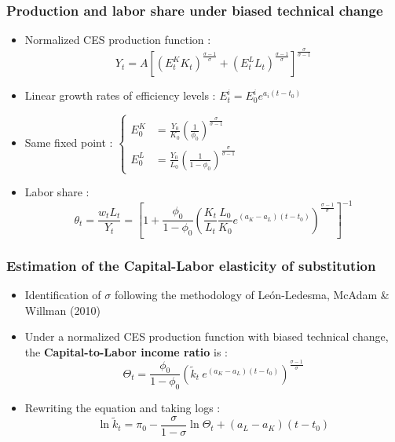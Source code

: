 \documentclass{beamer}
\begin{document}
		\begin{frame}[label = leon]\frametitle{Production and labor share under biased technical change}
			\begin{itemize}
				\item Normalized CES production function :
				\begin{equation*}
					Y_t = A\left[\left(E_t^K K_t\right)^{\frac{\sigma - 1}{\sigma}} + \left(E_t^L L_t\right)^{\frac{\sigma - 1}{\sigma}}\right]^{\frac{\sigma}{\sigma - 1}}
				\end{equation*}
				\item Linear growth rates of efficiency levels : $E_t^i = E_0^i e^{a_i(t-t_0)}$
				\item Same fixed point : $ \begin{cases}
				E_0^K &= \frac{Y_0}{K_0}\left(\frac{1}{\phi_0}\right)^{\frac{\sigma}{\sigma - 1}}\\
				E_0^L &= \frac{Y_0}{L_0}\left(\frac{1}{1-\phi_0}\right)^{\frac{\sigma}{\sigma - 1}}
				\end{cases}$
				\item Labor share :
				\begin{equation*}
					\theta_t = \frac{w_t L_t}{Y_t} = \left[  1 + \frac{\phi_0}{1-\phi_0}\left( \frac{K_t}{L_t} \frac{L_0}{K_0} e^{(a_K - a_L)(t-t_0)}\right)^{\frac{\sigma - 1}{\sigma}}\right]^{-1}
				\end{equation*}
			\end{itemize}
			\hyperlink{paraminit<1>}{}
		\end{frame}
		\begin{frame}\frametitle{Estimation of the Capital-Labor elasticity of substitution}
			\begin{itemize}
				\item Identification of $\sigma$ following the methodology of León-Ledesma, McAdam \& Willman (2010)
				\vspace{1em}
				\item Under a normalized CES production function with biased technical change, the \textbf{Capital-to-Labor income ratio} is :
				\begin{equation*}
				\Theta	_t = \frac{\phi_0}{1-\phi_0}\left( \tilde{k}_t ~ e^{(a_K - a_L)(t-t_0)}\right)^{\frac{\sigma - 1}{\sigma}}
				\end{equation*}
				\item Rewriting the equation and taking logs :
				\begin{equation*}
				\ln \tilde{k}_t = \pi_0 - \frac{\sigma}{1-\sigma} \ln \Theta_t + (a_L - a_K)(t-t_0)
				\end{equation*}
			\end{itemize}
			\hyperlink{paraminit<1>}{}
		\end{frame}
\end{document}
